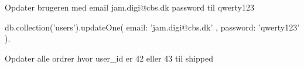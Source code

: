 \documentclass[english,course]{lecture}
\begin{document}
\begin{listing}[H]
\caption{Opdater brugeren med email jam.digi@cbs.dk password til qwerty123}
\begin{jscode}
db.collection('users').updateOne({
	email: 'jam.digi@cbs.dk'
}, {
	password: 'qwerty123'
}).
\end{jscode}
\end{listing}

\begin{listing}[H]
\caption{Opdater alle ordrer hvor user\_id er 42 eller 43 til shipped}
\end{listing}
\end{document}
